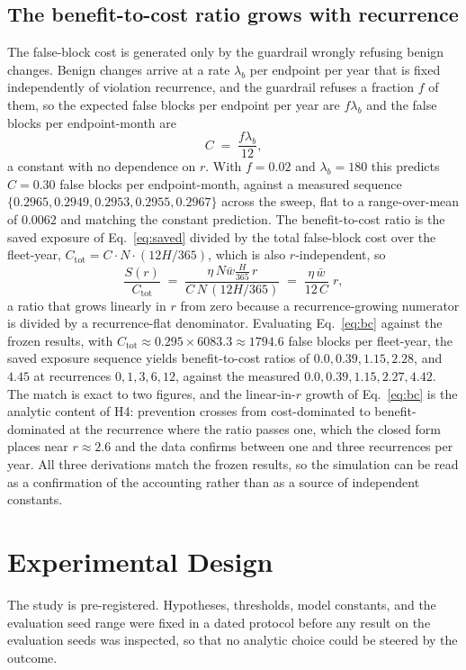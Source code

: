 \documentclass[journal]{IEEEtran}
\begin{document}
\subsection{The benefit-to-cost ratio grows with recurrence}
The false-block cost is generated only by the guardrail wrongly refusing benign changes. Benign
changes arrive at a rate $\lambda_b$ per endpoint per year that is fixed independently of violation
recurrence, and the guardrail refuses a fraction $f$ of them, so the expected false blocks per
endpoint per year are $f \lambda_b$ and the false blocks per endpoint-month are
\begin{equation}
C \;=\; \frac{f \lambda_b}{12},
\label{eq:cost}
\end{equation}
a constant with no dependence on $r$. With $f = 0.02$ and $\lambda_b = 180$ this predicts
$C = 0.30$ false blocks per endpoint-month, against a measured sequence
$\{0.2965, 0.2949, 0.2953, 0.2955, 0.2967\}$ across the sweep, flat to a range-over-mean of
$0.0062$ and matching the constant prediction. The benefit-to-cost ratio is the saved exposure of
Eq.~\eqref{eq:saved} divided by the total false-block cost over the fleet-year,
$C_{\text{tot}} = C \cdot N \cdot (12 H / 365)$, which is also $r$-independent, so
\begin{equation}
\frac{S(r)}{C_{\text{tot}}}
\;=\; \frac{\eta\, N \bar w \tfrac{H}{365}\, r}{C\, N\, (12 H/365)}
\;=\; \frac{\eta\, \bar w}{12\, C}\; r,
\label{eq:bc}
\end{equation}
a ratio that grows linearly in $r$ from zero because a recurrence-growing numerator is divided by a
recurrence-flat denominator. Evaluating Eq.~\eqref{eq:bc} against the frozen results, with
$C_{\text{tot}} \approx 0.295 \times 6083.3 \approx 1794.6$ false blocks per fleet-year, the saved
exposure sequence yields benefit-to-cost ratios of $0.0, 0.39, 1.15, 2.28$, and $4.45$ at
recurrences $0, 1, 3, 6, 12$, against the measured $0.0, 0.39, 1.15, 2.27, 4.42$. The match is
exact to two figures, and the linear-in-$r$ growth of Eq.~\eqref{eq:bc} is the analytic content of
H4: prevention crosses from cost-dominated to benefit-dominated at the recurrence where the ratio
passes one, which the closed form places near $r \approx 2.6$ and the data confirms between one and
three recurrences per year. All three derivations match the frozen results, so the simulation can
be read as a confirmation of the accounting rather than as a source of independent constants.

\section{Experimental Design}
The study is pre-registered. Hypotheses, thresholds, model constants, and the evaluation seed range
were fixed in a dated protocol before any result on the evaluation seeds was inspected, so that no
analytic choice could be steered by the outcome.
\end{document}
